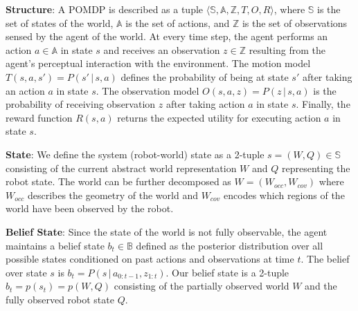 \documentclass{article}
\newcommand{\ph}[1]{{\textbf{#1}:}} %
\begin{document}
\ph{Structure} A POMDP is described as a tuple $\langle \mathbb{S}, \mathbb{A}, \mathbb{Z}, T, O, R \rangle$, where $\mathbb{S}$ is the set of states of the world, $\mathbb{A}$ is the set of actions, and $\mathbb{Z}$ is the set of observations sensed by the agent of the world. At every time step, the agent performs an action $a \in \mathbb{A}$ in state $s$ and receives an observation $z \in \mathbb{Z}$ resulting from the agent's perceptual interaction with the environment. The motion model $T(s, a, s') = P(s'\,|\,s, a)$ defines the probability of being at state $s'$ after taking an action $a$ in state $s$. The observation model $O(s, a, z) = P(z\,|\,s, a)$ is the probability of receiving observation $z$ after taking action $a$ in state $s$. Finally, the reward function $R(s,a)$ returns the expected utility for executing action $a$ in state $s$.

\ph{State} We define the system (robot-world) state as a 2-tuple $s = (W, Q) \in \mathbb{S}$ consisting of the current abstract world representation $W$ and $Q$ representing the robot state. The world can be further decomposed as $W = (W_{occ}, W_{cov})$ where $W_{occ}$ describes the geometry of the world and $W_{cov}$ encodes which regions of the world have been observed by the robot.   

\ph{Belief State} Since the state of the world is not fully observable, the agent maintains a belief state $b_t\in \mathbb{B}$ defined as the posterior distribution over all possible states conditioned on past actions and observations at time $t$. The belief over state $s$ is $b_{t} = P(s \,|\, a_{0:t-1}, z_{1:t})$. Our belief state is a 2-tuple $b_t = p(s_t) = p(W,Q)$ consisting of the partially observed world $W$ and the fully observed robot state $Q$.


\end{document}
